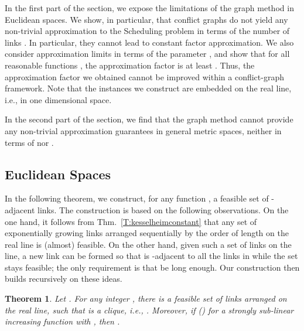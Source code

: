 \documentclass[11pt]{article}
\newcommand{\subsec}[1]{\subsection{#1}}
\newtheorem{theorem}{Theorem}
\newcommand{\scheduling}{\textsf{Scheduling}}
\begin{document}
In the first part of the section, we expose the limitations of the graph method in Euclidean spaces. We show, in particular, that conflict graphs do not yield any non-trivial approximation to the {\scheduling} problem in terms of the number of links . In particular, they cannot lead to constant factor approximation. We also consider approximation limits in terms of the parameter , and show that for all reasonable functions , the approximation factor is at least . Thus, the approximation factor we obtained cannot be improved within a conflict-graph framework. 
Note that the instances we construct are embedded on the real line, i.e., in one dimensional space. 

In the second part of the section, we find that the graph method cannot provide any non-trivial approximation guarantees
in general metric spaces, neither in terms of  nor .

\subsec{Euclidean Spaces}
In the following theorem, we construct, for any function , a feasible set of -adjacent links. The
construction is based on the following observations. On the one hand, it follows from Thm.\ \ref{T:kesselheimconstant}
that any set of exponentially growing links arranged sequentially by the order of length on the real line is (almost)
feasible. On the other hand, given such a set  of links on the line, a new link  can be formed so that
 is -adjacent to all the links in  while the set  stays feasible; the only requirement is that 
be long enough. Our construction then builds recursively on these ideas.
\begin{theorem}\label{T:ndependence}
Let . For any integer , there is a \emph{feasible} set  of  links arranged on the real line, such that  is a clique, i.e., . Moreover, if  () for a strongly sub-linear increasing function  with , then .
\end{theorem}
\end{document}
